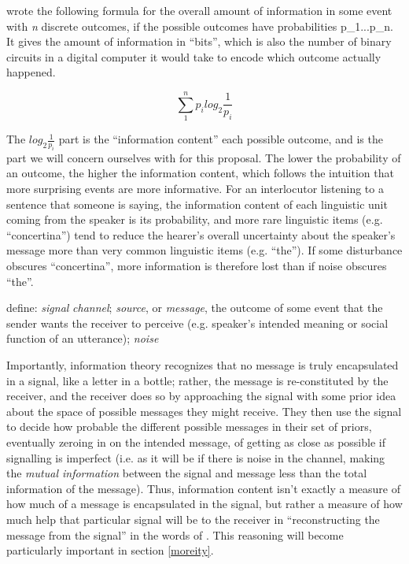 \documentclass[12pt]{article}
\begin{document}
\citet{shannon1948} wrote the following formula for the overall amount of information in some event with \textsl{n} discrete outcomes, if the possible outcomes have probabilities p_1...p_n. It gives the amount of information in ``bits'', which is also the number of binary circuits in a digital computer it would take to encode which outcome actually happened.

\begin{center}
	$$\sum_{1}^{n} p_i log_2 \frac{1}{p_i}$$
\end{center}

\noindent The $log_2 \frac{1}{p_i}$ part is the ``information content'' each possible outcome, and is the part we will concern ourselves with for this proposal. The lower the probability of an outcome, the higher the information content, which follows the intuition that more surprising events are more informative. For an interlocutor listening to a sentence that someone is saying, the information content of each linguistic unit coming from the speaker is its probability, and more rare linguistic items (e.g. ``concertina'') tend to reduce the hearer's overall uncertainty about the speaker's message more than very common linguistic items (e.g. ``the''). If some disturbance obscures ``concertina'', more information is therefore lost than if noise obscures ``the''.


define: \textsl{signal} \textsl{channel}; \textsl{source}, or \textsl{message}, the outcome of some event that the sender wants the receiver to perceive (e.g. speaker's intended meaning or social function of an utterance); \textsl{noise}

Importantly, information theory recognizes that no message is truly encapsulated in a signal, like a letter in a bottle; rather, the message is re-constituted by the receiver, and the receiver does so by approaching the signal with some prior idea about the space of possible messages they might receive. They then use the signal to decide how probable the different possible messages in their set of priors, eventually zeroing in on the intended message, of getting as close as possible if signalling is imperfect (i.e. as it will be if there is noise in the channel, making the \textsl{mutual information} between the signal and message less than the total information of the message). Thus, information content isn't exactly a measure of how much of a message is encapsulated in the signal, but rather a measure of how much help that particular signal will be to the receiver in ``reconstructing the message from the signal'' in the words of \citet{shannon1948}. This reasoning will become particularly important in section \ref{moreity}.
\end{document}
